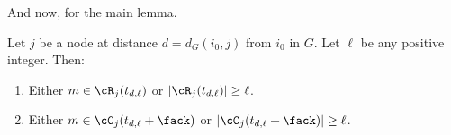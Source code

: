And now, for the main lemma.







\begin{lemma}\label{lemma:bmmblemma-full}
  Let $j$ be a node at distance $d=d_G(i_0,j)$ from $i_0$ in $G$.
  Let $\ell$ be any positive integer. Then:
\begin{enumerate}
  \item  Either $m\in \cR_j(t_{d,\ell})$ or $|\cR_j(t_{d,\ell})|\geq \ell$.

  \item  Either $m\in \cC_j(t_{d,\ell}+\fack)$ or $|\cC_j(t_{d,\ell}+\fack)|\geq \ell$.

  \end{enumerate}



\label{lem:bmmb:time}
\end{lemma}


